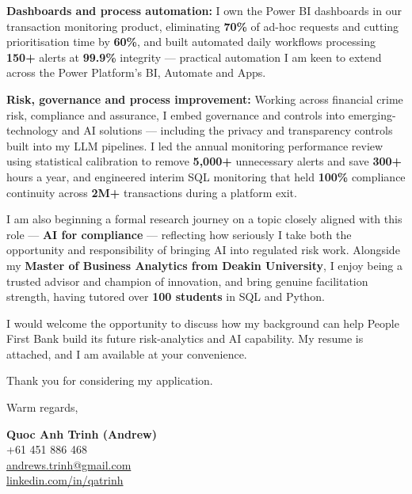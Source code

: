 \documentclass[11pt, a4paper]{letter}
\begin{document}
\textbf{Dashboards and process automation:}
I own the Power BI dashboards in our transaction monitoring product, eliminating \textbf{70\%} of ad-hoc requests and cutting prioritisation time by \textbf{60\%}, and built automated daily workflows processing \textbf{150+} alerts at \textbf{99.9\%} integrity --- practical automation I am keen to extend across the Power Platform's BI, Automate and Apps.

\textbf{Risk, governance and process improvement:}
Working across financial crime risk, compliance and assurance, I embed governance and controls into emerging-technology and AI solutions --- including the privacy and transparency controls built into my LLM pipelines. I led the annual monitoring performance review using statistical calibration to remove \textbf{5{,}000+} unnecessary alerts and save \textbf{300+} hours a year, and engineered interim SQL monitoring that held \textbf{100\%} compliance continuity across \textbf{2M+} transactions during a platform exit.

I am also beginning a formal research journey on a topic closely aligned with this role --- \textbf{AI for compliance} --- reflecting how seriously I take both the opportunity and responsibility of bringing AI into regulated risk work. Alongside my \textbf{Master of Business Analytics from Deakin University}, I enjoy being a trusted advisor and champion of innovation, and bring genuine facilitation strength, having tutored over \textbf{100 students} in SQL and Python.

I would welcome the opportunity to discuss how my background can help People First Bank build its future risk-analytics and AI capability. My resume is attached, and I am available at your convenience.

Thank you for considering my application.

\vspace{6pt}

Warm regards,

\vspace{18pt}

\textbf{Quoc Anh Trinh (Andrew)}\\
+61 451 886 468\\
\href{mailto:andrews.trinh@gmail.com}{andrews.trinh@gmail.com}\\
\href{https://www.linkedin.com/in/qatrinh}{linkedin.com/in/qatrinh}
\end{document}

